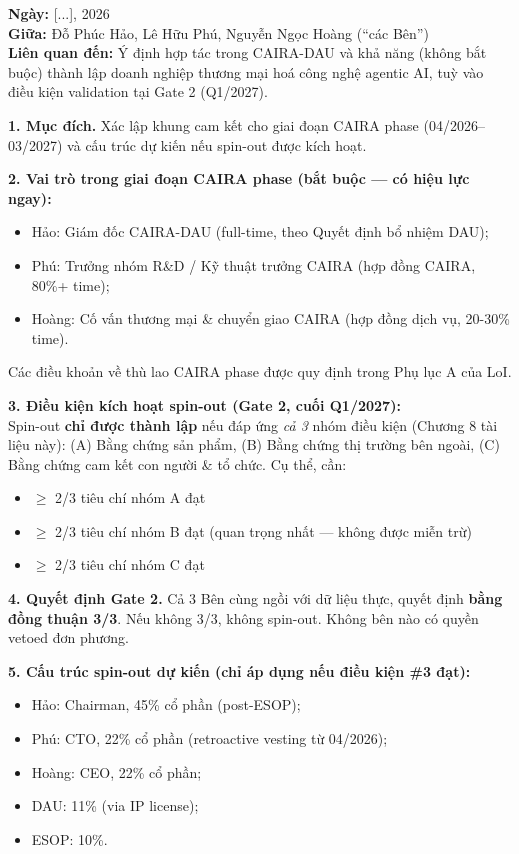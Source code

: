 \documentclass[11pt,a4paper]{article}
\begin{document}
\begin{tpl}[title=Letter of Intent --- Conditional Founder Agreement (template)]
\textbf{Ngày:} [...], 2026\\
\textbf{Giữa:} Đỗ Phúc Hảo, Lê Hữu Phú, Nguyễn Ngọc Hoàng (``các Bên'')\\
\textbf{Liên quan đến:} Ý định hợp tác trong CAIRA-DAU và khả năng (không bắt buộc)
thành lập doanh nghiệp thương mại hoá công nghệ agentic AI, tuỳ vào điều kiện
validation tại Gate 2 (Q1/2027).

\textbf{1. Mục đích.} Xác lập khung cam kết cho giai đoạn CAIRA phase (04/2026--03/2027) và cấu trúc dự kiến nếu spin-out được kích hoạt.

\textbf{2. Vai trò trong giai đoạn CAIRA phase (bắt buộc --- có hiệu lực ngay):}
\begin{itemize}
\item Hảo: Giám đốc CAIRA-DAU (full-time, theo Quyết định bổ nhiệm DAU);
\item Phú: Trưởng nhóm R\&D / Kỹ thuật trưởng CAIRA (hợp đồng CAIRA, 80\%+ time);
\item Hoàng: Cố vấn thương mại \& chuyển giao CAIRA (hợp đồng dịch vụ, 20-30\% time).
\end{itemize}
Các điều khoản về thù lao CAIRA phase được quy định trong Phụ lục A của LoI.

\textbf{3. Điều kiện kích hoạt spin-out (Gate 2, cuối Q1/2027):}\\
Spin-out \textbf{chỉ được thành lập} nếu đáp ứng \textit{cả 3} nhóm điều kiện (Chương
8 tài liệu này): (A) Bằng chứng sản phẩm, (B) Bằng chứng thị trường bên ngoài,
(C) Bằng chứng cam kết con người \& tổ chức. Cụ thể, cần:
\begin{itemize}
\item $\geq$ 2/3 tiêu chí nhóm A đạt
\item $\geq$ 2/3 tiêu chí nhóm B đạt (quan trọng nhất --- không được miễn trừ)
\item $\geq$ 2/3 tiêu chí nhóm C đạt
\end{itemize}

\textbf{4. Quyết định Gate 2.} Cả 3 Bên cùng ngồi với dữ liệu thực, quyết định
\textbf{bằng đồng thuận 3/3}. Nếu không 3/3, không spin-out. Không bên nào có
quyền vetoed đơn phương.

\textbf{5. Cấu trúc spin-out dự kiến (chỉ áp dụng nếu điều kiện \#3 đạt):}
\begin{itemize}
\item Hảo: Chairman, 45\% cổ phần (post-ESOP);
\item Phú: CTO, 22\% cổ phần (retroactive vesting từ 04/2026);
\item Hoàng: CEO, 22\% cổ phần;
\item DAU: 11\% (via IP license);
\item ESOP: 10\%.
\end{itemize}


\end{tpl}
\end{document}
